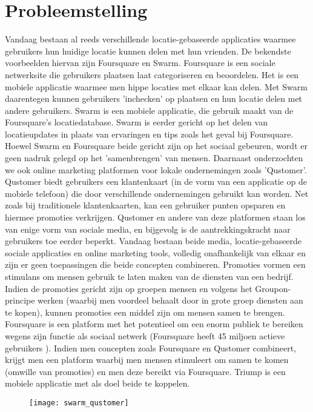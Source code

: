 \chapter{Probleemstelling}
Vandaag bestaan al reeds verschillende locatie-gebaseerde applicaties waarmee gebruikers hun huidige locatie kunnen delen met hun vrienden. De bekendste voorbeelden hiervan zijn Foursquare en Swarm. Foursquare is een sociale netwerksite die gebruikers plaatsen laat categoriseren en beoordelen. Het is een mobiele applicatie waarmee men hippe locaties met elkaar kan delen. Met Swarm daarentegen kunnen gebruikers 'inchecken' op plaatsen en hun locatie delen met andere gebruikers. Swarm is een mobiele applicatie, die gebruik maakt van de Foursquare's locatiedatabase. Swarm is eerder gericht op het delen van locatieupdates in plaats van ervaringen en tips zoals het geval bij Foursquare.
Hoewel Swarm en Foursquare beide gericht zijn op het sociaal gebeuren, wordt er geen nadruk gelegd op het 'samenbrengen' van mensen. 
Daarnaast onderzochten we ook online marketing platformen voor lokale ondernemingen zoals 'Qustomer'. Qustomer biedt gebruikers een klantenkaart (in de vorm van een applicatie op de mobiele telefoon) die door verschillende ondernemingen gebruikt kan worden. Net zoals bij traditionele klantenkaarten, kan een gebruiker punten opsparen en hiermee promoties verkrijgen. Qustomer en andere van deze platformen staan los van enige vorm van sociale media, en bijgevolg is de aantrekkingskracht naar gebruikers toe eerder beperkt.
Vandaag bestaan beide media, locatie-gebaseerde sociale applicaties en online marketing tools, volledig onafhankelijk van elkaar en zijn er geen toepassingen die beide concepten combineren. 
Promoties vormen een stimulans om mensen gebruik te laten maken van de diensten van een bedrijf. Indien de promoties gericht zijn op groepen mensen en volgens het Groupon-principe werken (waarbij men voordeel behaalt door in grote groep diensten aan te kopen), kunnen promoties een middel zijn om mensen samen te brengen.
Foursquare is een platform met het potentieel om een enorm publiek te bereiken wegens zijn functie als sociaal netwerk (Foursquare heeft 45 miljoen actieve gebruikers \cite{users}).
Indien men concepten zoals Foursquare en Qustomer combineert, krijgt men een platform waarbij men mensen stimuleert om samen te komen (omwille van promoties) en men deze bereikt via Foursquare.
Triump is een mobiele applicatie met als doel beide te koppelen. 
\begin{figure}[H]
	\centering
	\texttt{[image: swarm\_qustomer]}
	\label{fig:probleemstelling}
	
\end{figure}



